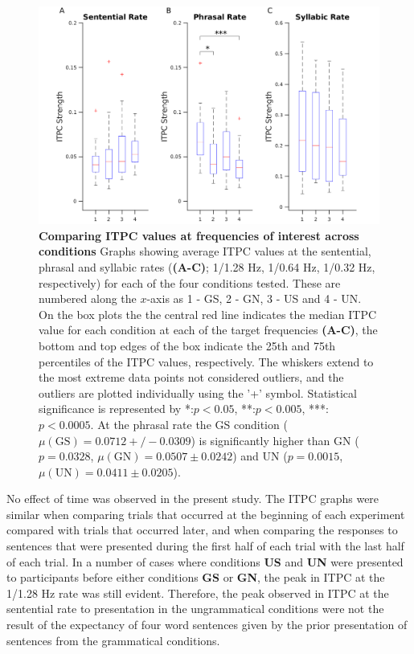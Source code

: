 \documentclass[a4paper,10pt,twoside]{article}
\begin{document}
\begin{figure}[tbp]
\includegraphics[width=\linewidth]{ITPC_peaks.png}
\caption{\textbf{Comparing ITPC values at frequencies of interest
    across conditions} Graphs showing average ITPC values at the
  sentential, phrasal and syllabic rates (\textbf{(A-C)}; 1/1.28 Hz,
  1/0.64 Hz, 1/0.32 Hz, respectively) for each of the four conditions
  tested. These are numbered along the $x$-axis as 1 - GS, 2 - GN, 3 -
  US and 4 - UN.  On the box plots the the central red line indicates
  the median ITPC value for each condition at each of the target
  frequencies \textbf{(A-C)}, the bottom and top edges of the box
  indicate the 25th and 75th percentiles of the ITPC values,
  respectively. The whiskers extend to the most extreme data points
  not considered outliers, and the outliers are plotted individually
  using the '+' symbol. Statistical significance is represented by
  *:$p<0.05$, **:$p<0.005$, ***:$p<0.0005$. At the phrasal rate the GS condition ($\mu(\mathrm{GS}) = 0.0712 +/- 0.0309$) is significantly higher than GN ($p =
0.0328$, $\mu(\mathrm{GN}) = 0.0507 \pm 0.0242$) and UN  ($p =
0.0015$, $\mu(\mathrm{UN}) = 0.0411 \pm 0.0205$).}
\label{ITPC_peaks}
\end{figure}

No effect of time was observed in the present study. The ITPC graphs
were similar when comparing trials that occurred at the beginning of
each experiment compared with trials that occurred later, and when
comparing the responses to sentences that were presented during the
first half of each trial with the last half of each trial. In a number
of cases where conditions \textbf{US} and \textbf{UN} were presented
to participants before either conditions \textbf{GS} or \textbf{GN},
the peak in ITPC at the 1/1.28 Hz rate was still evident. Therefore,
the peak observed in ITPC at the sentential rate to presentation in
the ungrammatical conditions were not the result of the expectancy of
four word sentences given by the prior presentation of sentences from
the grammatical conditions.
\end{document}
